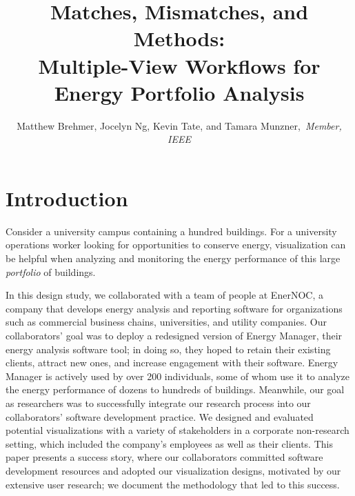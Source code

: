 \documentclass[journal]{vgtc}                %
\title{Matches, Mismatches, and Methods: \\ Multiple-View Workflows for Energy Portfolio Analysis}
\author{Matthew Brehmer, Jocelyn Ng, Kevin Tate, and Tamara Munzner,~\textit{Member, IEEE}}
\begin{document}

\maketitle



\section{Introduction}
\label{introduction}


Consider a university campus containing a hundred buildings. 
For a university operations worker looking for opportunities to conserve energy, visualization can be helpful when analyzing and monitoring the energy performance of this large {\it portfolio} of buildings. 

In this design study, we collaborated with a team of people at EnerNOC, a company that develops energy analysis and reporting software for organizations such as commercial business chains, universities, and utility companies.
Our collaborators' goal was to deploy a redesigned version of Energy Manager, their energy analysis software tool; in doing so, they hoped to retain their existing clients, attract new ones, and increase engagement with their software. 
Energy Manager is actively used by over 200 individuals, some of whom use it to analyze the energy performance of dozens to hundreds of buildings.
Meanwhile, our goal as researchers was to successfully integrate our research process into our collaborators' software development practice.
We designed and evaluated potential visualizations with a variety of stakeholders in a corporate non-research setting, which included the company's employees as well as their clients.
This paper presents a success story, where our collaborators committed software development resources and adopted our visualization designs, motivated by our extensive user research; we document the methodology that led to this success.
\end{document}
